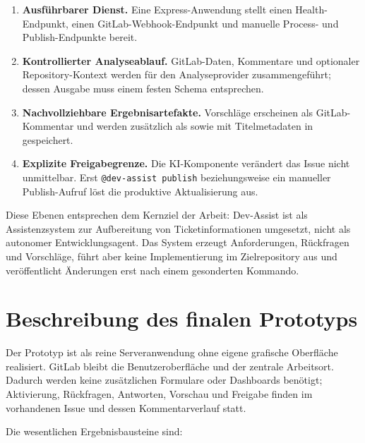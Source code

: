 \begin{enumerate}[leftmargin=1.2cm]
\item \textbf{Ausführbarer Dienst.} Eine Express-Anwendung stellt einen Health-Endpunkt, einen GitLab-Webhook-Endpunkt und manuelle Process- und Publish-Endpunkte bereit.
\item \textbf{Kontrollierter Analyseablauf.} GitLab-Daten, Kommentare und optionaler Repository-Kontext werden für den Analyseprovider zusammengeführt; dessen Ausgabe muss einem festen Schema entsprechen.
\item \textbf{Nachvollziehbare Ergebnisartefakte.} Vorschläge erscheinen als GitLab-Kommentar und werden zusätzlich als  sowie mit Titelmetadaten in  gespeichert.
\item \textbf{Explizite Freigabegrenze.} Die KI-Komponente verändert das Issue nicht unmittelbar. Erst \texttt{@dev-assist publish} beziehungsweise ein manueller Publish-Aufruf löst die produktive Aktualisierung aus.
\end{enumerate}

Diese Ebenen entsprechen dem Kernziel der Arbeit: Dev-Assist ist als Assistenzsystem zur Aufbereitung von Ticketinformationen umgesetzt, nicht als autonomer Entwicklungsagent. Das System erzeugt Anforderungen, Rückfragen und Vorschläge, führt aber keine Implementierung im Zielrepository aus und veröffentlicht Änderungen erst nach einem gesonderten Kommando.

\section{Beschreibung des finalen Prototyps}

Der Prototyp ist als reine Serveranwendung ohne eigene grafische Oberfläche realisiert. GitLab bleibt die Benutzeroberfläche und der zentrale Arbeitsort. Dadurch werden keine zusätzlichen Formulare oder Dashboards benötigt; Aktivierung, Rückfragen, Antworten, Vorschau und Freigabe finden im vorhandenen Issue und dessen Kommentarverlauf statt.

Die wesentlichen Ergebnisbausteine sind:

